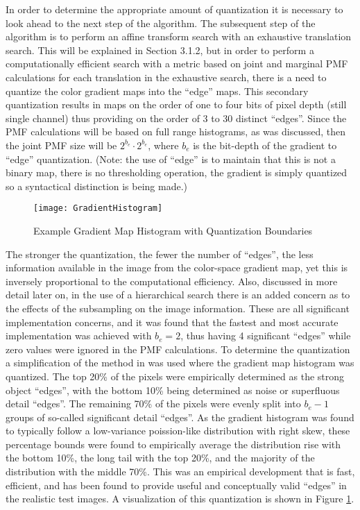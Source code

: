 In order to determine the appropriate amount of quantization it is necessary to look ahead to the next step of the algorithm. The subsequent step of the algorithm is to perform an affine transform search with an exhaustive translation search. This will be explained in Section 3.1.2, but in order to perform a computationally efficient search with a metric based on joint and marginal PMF calculations for each translation in the exhaustive search, there is a need to quantize the color gradient maps into the ``edge'' maps. This secondary quantization results in maps on the order of one to four bits of pixel depth (still single channel) thus providing on the order of 3 to 30 distinct ``edges''. Since the PMF calculations will be based on full range histograms, as was discussed, then the joint PMF size will be $2^{b_{e}}\cdot2^{b_{e}}$, where $b_{e}$ is the bit-depth of the gradient to ``edge'' quantization. (Note: the use of ``edge'' is to maintain that this is not a binary map, there is no thresholding operation, the gradient is simply quantized so a syntactical distinction is being made.)

\begin{figure}[h]
\centering
\texttt{[image: GradientHistogram]}
\caption{Example Gradient Map Histogram with Quantization Boundaries}
\label{gradienthistogram}
\end{figure}

The stronger the quantization, \ie{ }the fewer the number of ``edges'', the less information available in the image from the color-space gradient map, yet this is inversely proportional to the computational efficiency. Also, discussed in more detail later on, in the use of a hierarchical search there is an added concern as to the effects of the subsampling on the image information. These are all significant implementation concerns, and it was found that the fastest and most accurate implementation was achieved with $b_{e}=2$, thus having 4 significant ``edges'' while zero values were ignored in the PMF calculations. To determine the quantization a simplification of the method in \cite{Ugarriza2009} was used where the gradient map histogram was quantized. The top 20\% of the pixels were empirically determined as the strong object ``edges'', with the bottom 10\% being determined as noise or superfluous detail ``edges''. The remaining 70\% of the pixels were evenly split into $b_{e}-1$ groups of so-called significant detail ``edges''. As the gradient histogram was found to typically follow a low-variance poission-like distribution with right skew, these percentage bounds were found to empirically average the distribution rise with the bottom 10\%, the long tail with the top 20\%, and the majority of the distribution with the middle 70\%. This was an empirical development that is fast, efficient, and has been found to provide useful and conceptually valid ``edges'' in the realistic test images. A visualization of this quantization is shown in Figure \ref{gradienthistogram}.



